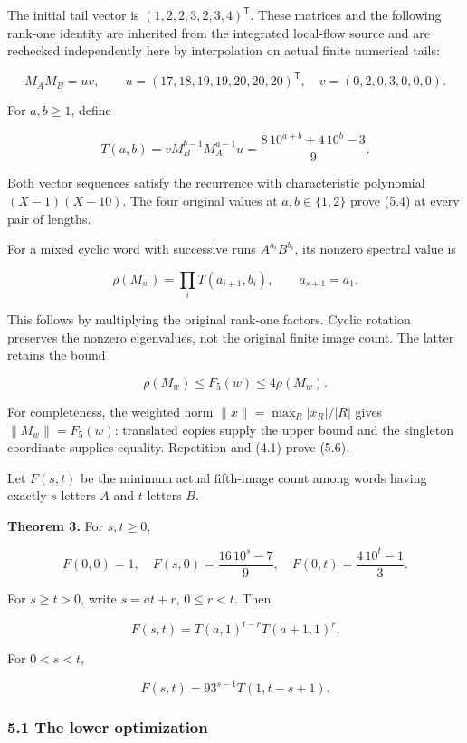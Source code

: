 The initial tail vector is \((1,2,2,3,2,3,4)^{\mathsf T}\). These matrices and the following rank-one identity are inherited from the integrated local-flow source and are rechecked independently here by interpolation on actual finite numerical tails:

\[
M_AM_B=uv,\qquad
u=(17,18,19,19,20,20,20)^{\mathsf T},\quad
v=(0,2,0,3,0,0,0).
\tag{5.3}
\]

For \(a,b\ge1\), define

\[
T(a,b)=vM_B^{b-1}M_A^{a-1}u
=\frac{8\,10^{a+b}+4\,10^b-3}{9}.
\tag{5.4}
\]

Both vector sequences satisfy the recurrence with characteristic polynomial \((X-1)(X-10)\). The four original values at \(a,b\in\{1,2\}\) prove (5.4) at every pair of lengths.

For a mixed cyclic word with successive runs \(A^{a_i}B^{b_i}\), its nonzero spectral value is

\[
\rho(M_w)=\prod_i T(a_{i+1},b_i),\qquad a_{s+1}=a_1.
\tag{5.5}
\]

This follows by multiplying the original rank-one factors. Cyclic rotation preserves the nonzero eigenvalues, not the original finite image count. The latter retains the bound

\[
\rho(M_w)\le F_5(w)\le4\rho(M_w).
\tag{5.6}
\]

For completeness, the weighted norm \(\|x\|=\max_R|x_R|/|R|\) gives \(\|M_w\|=F_5(w)\): translated copies supply the upper bound and the singleton coordinate supplies equality. Repetition and (4.1) prove (5.6).

Let \(F(s,t)\) be the minimum actual fifth-image count among words having exactly \(s\) letters \(A\) and \(t\) letters \(B\).

\textbf{Theorem 3.} For \(s,t\ge0\),

\[
F(0,0)=1,\quad
F(s,0)=\frac{16\,10^s-7}{9},\quad
F(0,t)=\frac{4\,10^t-1}{3}.
\tag{5.7}
\]

For \(s\ge t>0\), write \(s=at+r\), \(0\le r<t\). Then

\[
\boxed{F(s,t)=T(a,1)^{t-r}T(a+1,1)^r.}
\tag{5.8}
\]

For \(0<s<t\),

\[
\boxed{F(s,t)=93^{s-1}T(1,t-s+1).}
\tag{5.9}
\]

\subsubsection{5.1 The lower optimization}\label{eporig:the-lower-optimization}

